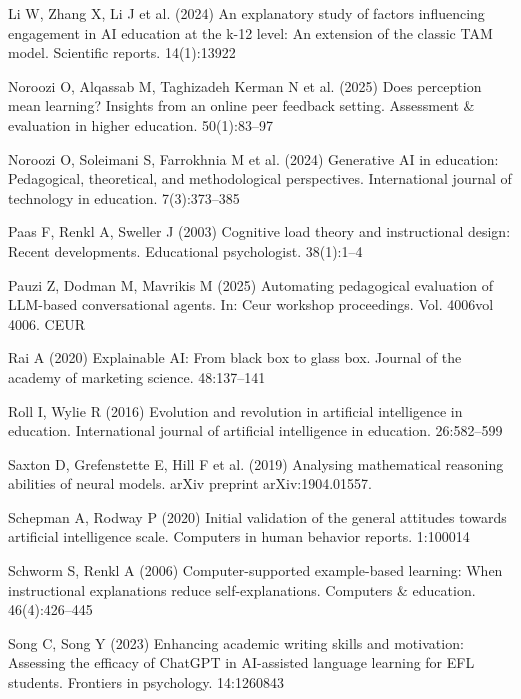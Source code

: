 \documentclass[
  11pt,
]{article}
\newlength{\cslhangindent}
\newenvironment{CSLReferences}[2] %
 {\begin{list}{}{%
  \setlength{\itemindent}{0pt}
  \setlength{\leftmargin}{0pt}
  \setlength{\parsep}{0pt}
  \ifodd #1
   \setlength{\leftmargin}{\cslhangindent}
   \setlength{\itemindent}{-1\cslhangindent}
  \fi
  \setlength{\itemsep}{#2\baselineskip}}}
 {\end{list}}
\begin{document}
\begin{CSLReferences}{1}{0}
Li W, Zhang X, Li J et al. (2024) An explanatory study of factors influencing engagement in AI education at the k-12 level: An extension of the classic TAM model. Scientific reports. 14(1):13922

Noroozi O, Alqassab M, Taghizadeh Kerman N et al. (2025) Does perception mean learning? Insights from an online peer feedback setting. Assessment \& evaluation in higher education. 50(1):83--97

Noroozi O, Soleimani S, Farrokhnia M et al. (2024) Generative AI in education: Pedagogical, theoretical, and methodological perspectives. International journal of technology in education. 7(3):373--385

Paas F, Renkl A, Sweller J (2003) Cognitive load theory and instructional design: Recent developments. Educational psychologist. 38(1):1--4

Pauzi Z, Dodman M, Mavrikis M (2025) Automating pedagogical evaluation of LLM-based conversational agents. In: Ceur workshop proceedings. Vol. 4006vol 4006. CEUR

Rai A (2020) Explainable AI: From black box to glass box. Journal of the academy of marketing science. 48:137--141

Roll I, Wylie R (2016) Evolution and revolution in artificial intelligence in education. International journal of artificial intelligence in education. 26:582--599

Saxton D, Grefenstette E, Hill F et al. (2019) Analysing mathematical reasoning abilities of neural models. arXiv preprint arXiv:1904.01557.

Schepman A, Rodway P (2020) Initial validation of the general attitudes towards artificial intelligence scale. Computers in human behavior reports. 1:100014

Schworm S, Renkl A (2006) Computer-supported example-based learning: When instructional explanations reduce self-explanations. Computers \& education. 46(4):426--445

Song C, Song Y (2023) Enhancing academic writing skills and motivation: Assessing the efficacy of ChatGPT in AI-assisted language learning for EFL students. Frontiers in psychology. 14:1260843


\end{CSLReferences}
\end{document}

